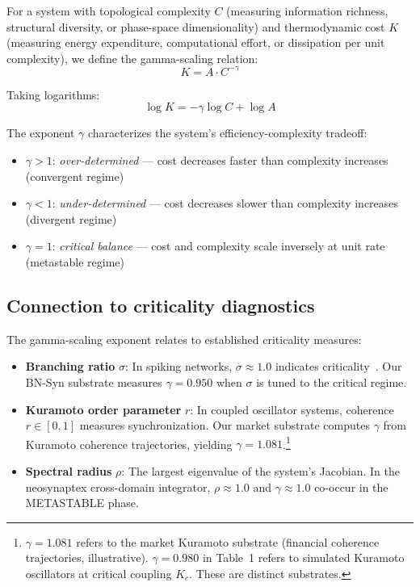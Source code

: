 \documentclass[11pt,a4paper,twocolumn]{article}
\begin{document}
For a system with topological complexity $C$ (measuring information richness, structural diversity, or phase-space dimensionality) and thermodynamic cost $K$ (measuring energy expenditure, computational effort, or dissipation per unit complexity), we define the gamma-scaling relation:
\begin{equation}
K = A \cdot C^{-\gamma}
\end{equation}

Taking logarithms:
\begin{equation}
\log K = -\gamma \log C + \log A
\end{equation}

The exponent $\gamma$ characterizes the system's efficiency-complexity tradeoff:
\begin{itemize}
\item $\gamma > 1$: \emph{over-determined} --- cost decreases faster than complexity increases (convergent regime)
\item $\gamma < 1$: \emph{under-determined} --- cost decreases slower than complexity increases (divergent regime)
\item $\gamma = 1$: \emph{critical balance} --- cost and complexity scale inversely at unit rate (metastable regime)
\end{itemize}

\subsection{Connection to criticality diagnostics}

The gamma-scaling exponent relates to established criticality measures:
\begin{itemize}
\item \textbf{Branching ratio} $\sigma$: In spiking networks, $\sigma \approx 1.0$ indicates criticality~\cite{beggs2003}. Our BN-Syn substrate measures $\gamma = 0.950$ when $\sigma$ is tuned to the critical regime.
\item \textbf{Kuramoto order parameter} $r$: In coupled oscillator systems, coherence $r \in [0,1]$ measures synchronization. Our market substrate computes $\gamma$ from Kuramoto coherence trajectories, yielding $\gamma = 1.081$.\footnote{$\gamma = 1.081$ refers to the market Kuramoto substrate (financial coherence trajectories, illustrative). $\gamma = 0.980$ in Table~1 refers to simulated Kuramoto oscillators at critical coupling $K_c$. These are distinct substrates.}
\item \textbf{Spectral radius} $\rho$: The largest eigenvalue of the system's Jacobian. In the neosynaptex cross-domain integrator, $\rho \approx 1.0$ and $\gamma \approx 1.0$ co-occur in the METASTABLE phase.
\end{itemize}
\end{document}
